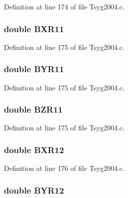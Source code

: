 Definition at line 174 of file Tsyg2004.c.\hypertarget{struct___t_s04_info_d8d0d299f1a439a463f83df71dbc5f44}{
\subsubsection[{BXR11}]{\setlength{\rightskip}{0pt plus 5cm}double {\bf BXR11}}}
\label{struct___t_s04_info_d8d0d299f1a439a463f83df71dbc5f44}




Definition at line 175 of file Tsyg2004.c.\hypertarget{struct___t_s04_info_9485aa9f5abaefd62d2f430c82acb65b}{
\subsubsection[{BYR11}]{\setlength{\rightskip}{0pt plus 5cm}double {\bf BYR11}}}
\label{struct___t_s04_info_9485aa9f5abaefd62d2f430c82acb65b}




Definition at line 175 of file Tsyg2004.c.\hypertarget{struct___t_s04_info_dde08ef0abaed458dfa0b797e4dbb5bf}{
\subsubsection[{BZR11}]{\setlength{\rightskip}{0pt plus 5cm}double {\bf BZR11}}}
\label{struct___t_s04_info_dde08ef0abaed458dfa0b797e4dbb5bf}




Definition at line 175 of file Tsyg2004.c.\hypertarget{struct___t_s04_info_f458e0735f7ff015dca398deb8590923}{
\subsubsection[{BXR12}]{\setlength{\rightskip}{0pt plus 5cm}double {\bf BXR12}}}
\label{struct___t_s04_info_f458e0735f7ff015dca398deb8590923}




Definition at line 176 of file Tsyg2004.c.\hypertarget{struct___t_s04_info_d23df4618743e8dc55c84f391e76fe8e}{
\subsubsection[{BYR12}]{\setlength{\rightskip}{0pt plus 5cm}double {\bf BYR12}}}
\label{struct___t_s04_info_d23df4618743e8dc55c84f391e76fe8e}




